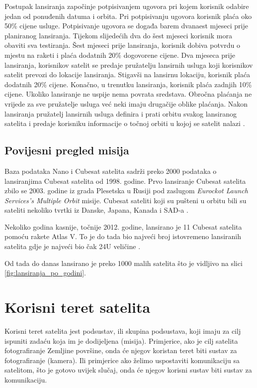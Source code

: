 \documentclass[times, utf8, diplomski, numeric]{templates/template}
\begin{document}
{{            Postupak lansiranja započinje potpisivanjem ugovora pri kojem korisnik odabire jedan od ponuđenih datuma i orbita. Pri potpisivanju ugovora korisnik plaća oko 50\% cijene usluge. Potpisivanje ugovora se događa barem dvanaest mjeseci prije planiranog lansiranja. Tijekom slijedećih dva do šest mjeseci korisnik mora obaviti sva testiranja. Šest mjeseci prije lansiranja, korisnik dobiva potvrdu o mjestu na raketi i plaća dodatnih 20\% dogovorene cijene. Dva mjeseca prije lansiranja, korisnikov satelit se predaje pružatelju lansirnih usluga koji korisnikov satelit prevozi do lokacije lansiranja. Stigavši na lansirnu lokaciju, korisnik plaća dodatnih 20\% cijene. Konačno, u trenutku lansiranja, korisnik plaća zadnjih 10\% cijene. Ukoliko lansiranje ne uspije nema povrata sredstava. Obročna plaćanja ne vrijede za sve pružatelje usluga već neki imaju drugačije oblike plaćanja. Nakon lansiranja pružatelj lansirnih usluga definira i prati orbitu svakog lansiranog satelita i predaje korisniku informacije o točnoj orbiti u kojoj se satelit nalazi \cite{fersat}. 
        
        \subsection{Povijesni pregled misija}{
            Baza podataka Nano i Cubesat satelita \cite{nanosats} sadrži preko 2000 podataka o lansiranjima Cubesat satelita od 1998. godine. Prvo lansiranje Cubesat satelita zbilo se 2003. godine iz grada Plesetska u Rusiji pod zaslugom \emph{Eurockot Launch Services's Multiple Orbit} misije. Cubesat sateliti koji su pušteni u orbitu bili su sateliti nekoliko tvrtki iz Danske, Japana, Kanada i SAD-a \cite{prva_misija}.

            Nekoliko godina kasnije, točnije 2012. godine, lansirano je 11 Cubesat satelita pomoću rakete Atlas V. To je do tada bio najveći broj istovremeno lansiranih satelita gdje je najveći bio čak 24U veličine \cite{najveci_lansirni_broj}.

            Od tada do danas lansirano je preko 1000 malih satelita što je vidljivo na slici \ref{fig:lansiranja_po_godini}.
        }
    }

    \section{Korisni teret satelita}{
        Korisni teret satelita  jest podsustav, ili skupina podsustava, koji imaju za cilj ispuniti zadaću koja im je dodijeljena (misija). Primjerice, ako je cilj satelita fotografiranje Zemljine površine, onda će njegov koristan teret biti sustav za fotografiranje (kamera). Ili primjerice ako želimo uspostaviti komunikaciju sa satelitom, što je gotovo uvijek slučaj, onda će njegov korisni sustav biti sustav za komunikaciju.

}}
\end{document}
